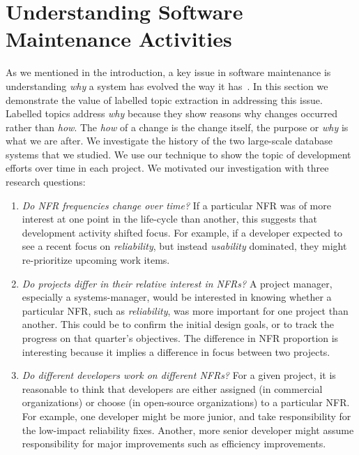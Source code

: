 \documentclass[smallextended]{svjour3}       %
\begin{document}
\section{Understanding Software Maintenance Activities} 
\label{sec:analysis}
As we mentioned in the introduction, a key issue in software maintenance is understanding \emph{why} a system has evolved the way it has~\cite{aranda09icse}. 
In this section we demonstrate the value of labelled topic extraction
in addressing this issue. 
Labelled topics address \emph{why}  because they show reasons why changes
occurred rather than \emph{how}. 
The \emph{how} of a change is the change itself, the purpose or
\emph{why} is what we are after.
We investigate the history of the two large-scale database systems that we studied. 
We use our technique to show the topic of development efforts over time in each project.
We motivated our investigation with three research questions:
\begin{enumerate}
\item \emph{Do NFR frequencies change over time?} If a particular NFR
  was of more interest at one point in the life-cycle than another,
  this suggests that development activity shifted focus. For example,
  if a developer expected to see a recent focus on \emph{reliability},
  but instead \emph{usability} dominated, they might re-prioritize
  upcoming work items.

\item \emph{Do projects differ in their relative interest in NFRs?} A
  project manager, especially a systems-manager, would be interested
  in knowing whether a particular NFR, such as \emph{reliability}, was
  more important for one project than another. This could be to
  confirm the initial design goals, or to track the progress on that
  quarter's objectives.  The difference in NFR proportion is
  interesting because it implies a difference in focus between two projects.

\item \emph{Do different developers work on different NFRs?} For a given project, it is reasonable to think that developers are either assigned (in commercial organizations) or choose (in open-source organizations) to a particular NFR. For example, one developer might be more junior, and take responsibility for the low-impact reliability fixes. Another, more senior developer might assume responsibility for major improvements such as efficiency improvements. 

\end{enumerate}
\end{document}
